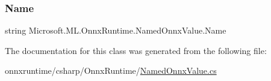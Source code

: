 \subsubsection{\texorpdfstring{Name}{Name}}
{\footnotesize\ttfamily string Microsoft.\+M\+L.\+Onnx\+Runtime.\+Named\+Onnx\+Value.\+Name\hspace{0.3cm}{\ttfamily [get]}}



The documentation for this class was generated from the following file\+:\begin{DoxyCompactItemize}
\item 
onnxruntime/csharp/\+Onnx\+Runtime/\mbox{\hyperlink{OnnxRuntime_2NamedOnnxValue_8cs}{Named\+Onnx\+Value.\+cs}}\end{DoxyCompactItemize}

